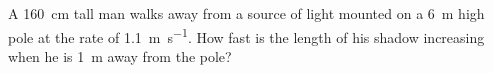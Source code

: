 
%
%
%
%
% 
% 

\question A \SI{160}{\centi\metre} tall man walks away from a source of light 
mounted on a \SI{6}{\meter} high pole at the rate of \SI{1.1}{\meter\per\second}.
How fast is the length of his shadow increasing when he is \SI{1}{\meter} away from the pole?

\insertQR{}

